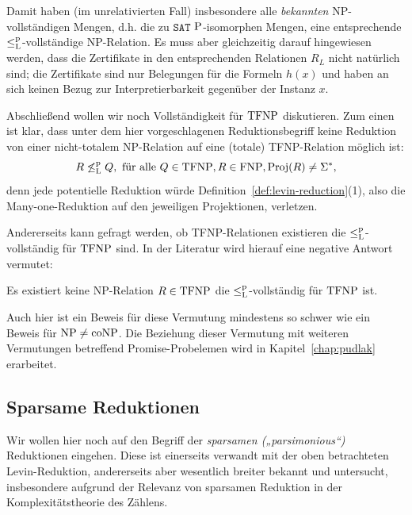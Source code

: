 Damit haben (im unrelativierten Fall) insbesondere alle \emph{bekannten} NP-vollständigen Mengen, d.h. die zu $\mathtt{SAT}$ $\P$-isomorphen Mengen, eine entsprechende $\leqlp$-vollständige NP-Relation.
Es muss aber gleichzeitig darauf hingewiesen werden, dass die Zertifikate in den entsprechenden Relationen $R_L$ nicht natürlich sind; die Zertifikate sind nur Belegungen für die Formeln $h(x)$ und haben an sich keinen Bezug zur Interpretierbarkeit gegenüber der Instanz $x$.

Abschließend wollen wir noch Vollständigkeit für $\TFNP$ diskutieren. Zum einen ist klar, dass unter dem hier vorgeschlagenen Reduktionsbegriff keine Reduktion von einer nicht-totalem NP-Relation auf eine (totale) TFNP-Relation möglich ist: 
\[ R \not\leq_{\mathrm L}^{\mathrm p} Q, \text{ für alle } Q\in\TFNP, R\in\FNP, \Proj(R)\neq\Sigma^*, \]
denn jede potentielle Reduktion würde Definition~\ref{def:levin-reduction}(1), also  die Many-one-Reduktion auf den jeweiligen Projektionen, verletzen.

Andererseits kann gefragt werden, ob TFNP-Relationen existieren die $\leqlp$-vollständig für $\TFNP$ sind. In der Literatur \parencite[vgl.][]{pudlak_incompleteness_2017} wird hierauf eine negative Antwort vermutet:
\begin{conjecture}[\hTFNP]
    Es existiert keine NP-Relation $R\in\TFNP$ die $\leqlp$-vollständig für $\TFNP$ ist.
\end{conjecture}
Auch hier ist ein Beweis für diese Vermutung mindestens so schwer wie ein Beweis für $\NP\neq\coNP$. Die Beziehung dieser Vermutung mit weiteren Vermutungen betreffend Promise-Probelemen wird in Kapitel~\ref{chap:pudlak} erarbeitet.

\subsection*{Sparsame Reduktionen}

Wir wollen hier noch auf den Begriff der \emph{sparsamen („parsimonious“)} Reduktionen eingehen. Diese ist einerseits verwandt mit der oben betrachteten Levin-Reduktion, andererseits aber wesentlich breiter bekannt und untersucht, insbesondere aufgrund der Relevanz von sparsamen Reduktion in der Komplexitätstheorie des Zählens.


